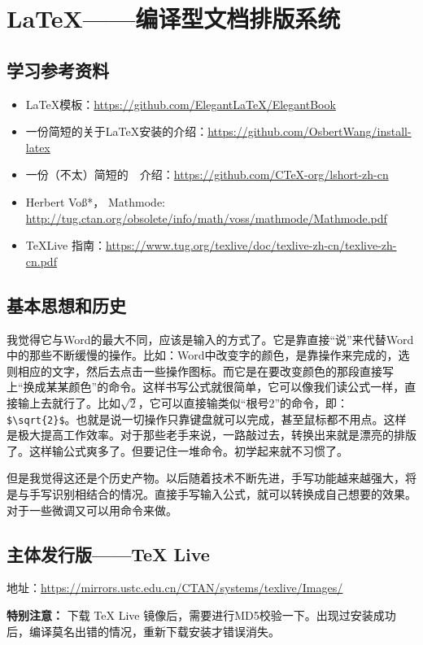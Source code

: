 \chapter{\LaTeX{}——编译型文档排版系统}
\section{学习参考资料}
\begin{itemize}
\item \LaTeX{}模板：\url{https://github.com/ElegantLaTeX/ElegantBook}
\item 一份简短的关于\LaTeX{}安装的介绍：\url{https://github.com/OsbertWang/install-latex}
\item 一份（不太）简短的~\LaTeXe{}~介绍：\url{https://github.com/CTeX-org/lshort-zh-cn}
\item Herbert Voß*，  Mathmode: \url{http://tug.ctan.org/obsolete/info/math/voss/mathmode/Mathmode.pdf}
\item \TeX Live 指南：\url{https://www.tug.org/texlive/doc/texlive-zh-cn/texlive-zh-cn.pdf}
\end{itemize}


\section{基本思想和历史}
我觉得它与Word的最大不同，应该是输入的方式了。它是靠直接“说”来代替Word中的那些不断缓慢的操作。比如：Word中改变字的颜色，是靠操作来完成的，选则相应的文字，然后去点击一些操作图标。而它是在要改变颜色的那段直接写上“换成某某颜色”的命令。这样书写公式就很简单，它可以像我们读公式一样，直接输上去就行了。比如$\sqrt{2}$，它可以直接输类似“根号2”的命令，即：\verb|$\sqrt{2}$|。也就是说一切操作只靠键盘就可以完成，甚至鼠标都不用点。这样是极大提高工作效率。对于那些老手来说，一路敲过去，转换出来就是漂亮的排版了。这样输公式爽多了。但要记住一堆命令。初学起来就不习惯了。

但是我觉得这还是个历史产物。以后随着技术不断先进，手写功能越来越强大，将是与手写识别相结合的情况。直接手写输入公式，就可以转换成自己想要的效果。对于一些微调又可以用命令来做。




\section{主体发行版——\TeX{} Live }
地址：\url{https://mirrors.ustc.edu.cn/CTAN/systems/texlive/Images/}

\textbf{特别注意：} 下载 \TeX{} Live 镜像后，需要进行MD5校验一下。出现过安装成功后，编译莫名出错的情况，重新下载安装才错误消失。


